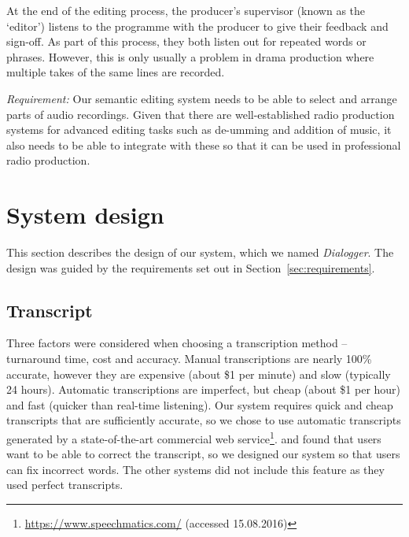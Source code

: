 At the end of the editing process, the producer's supervisor (known as the `editor') listens to the programme with the
producer to give their feedback and sign-off. As part of this process, they both listen out for repeated words or
phrases. However, this is only usually a problem in drama production where multiple takes of the same lines are
recorded.

\textit{Requirement:} Our semantic editing system needs to be able to select and arrange parts of audio recordings.
Given that there are well-established radio production systems for advanced editing tasks such as de-umming and
addition of music, it also needs to be able to integrate with these so that it can be used in professional radio
production.


%
%
%
%
%
%

\section{System design}\label{sec:screen-design}
This section describes the design of our system, which we named \textit{Dialogger}. The design was guided by the
requirements set out in Section~\ref{sec:requirements}.

\subsection{Transcript}
Three factors were considered when choosing a transcription method -- turnaround time, cost and accuracy. Manual
transcriptions are nearly 100\% accurate, however they are expensive (about \$1 per minute) and slow (typically 24
hours). Automatic transcriptions are imperfect, but cheap (about \$1 per hour) and fast (quicker than real-time
listening). Our system requires quick and cheap transcripts that are sufficiently accurate, so we chose to use automatic
transcripts generated by a state-of-the-art commercial web service\footnote{\url{https://www.speechmatics.com/}
  (accessed 15.08.2016)}.
\citet{Whittaker2004} and \citet{Sivaraman2016} found that users want to be able to correct the transcript, so we
designed our system so that users can fix incorrect words.
The other systems did not include this feature as they used perfect transcripts.

